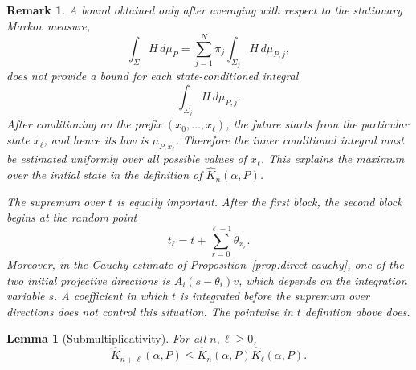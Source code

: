 \documentclass[11pt,a4paper]{amsart}
\newtheorem{lemma}[theorem]{Lemma}
\newtheorem{remark}[theorem]{Remark}
\begin{document}
\begin{remark}
   A bound obtained only after averaging with respect to the stationary
Markov measure,
\[
 \int_\Sigma H\,d\mu_P
 =
 \sum_{j=1}^N\pi_j
 \int_{\Sigma_j}H\,d\mu_{P,j},
\]
does not provide a bound for each state-conditioned integral
\[
 \int_{\Sigma_j}H\,d\mu_{P,j}.
\]
After conditioning on the prefix
\((x_0,\ldots,x_\ell)\), the future starts from the particular state
\(x_\ell\), and hence its law is \(\mu_{P,x_\ell}\).  Therefore the
inner conditional integral must be estimated uniformly over all
possible values of \(x_\ell\).  This explains the maximum over the
initial state in the definition of \(\widehat K_n(\alpha,P)\).

The supremum over \(t\) is equally important.  After the first block,
the second block begins at the random point
\[
 t_\ell=t+\sum_{r=0}^{\ell-1}\theta_{x_r}.
\]
Moreover, in the Cauchy estimate of
Proposition~\ref{prop:direct-cauchy}, one of the two initial
projective directions is \(A_i(s-\theta_i)v\), which depends on the
integration variable \(s\).  A coefficient in which \(t\) is
integrated before the supremum over directions does not control this
situation.  The pointwise in \(t\) definition above does.
\end{remark}

\begin{lemma}[Submultiplicativity]\label{lem:submult}
For all \(n,\ell\ge0\),
\[
 \widehat K_{n+\ell}(\alpha,P)
 \le \widehat K_n(\alpha,P)\widehat K_\ell(\alpha,P).
\]
\end{lemma}

\end{document}
